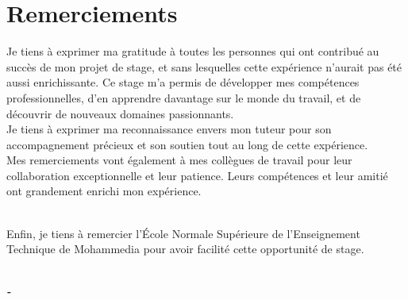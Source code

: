 \newpage
\thispagestyle{empty}
\mbox{} %
\chapter*{\Huge Remerciements }
\begin{quoting}
	\begin{center}
		\large{
			Je tiens à exprimer ma gratitude à toutes les personnes qui ont
contribué au succès de mon projet de stage, et sans lesquelles cette
expérience n’aurait pas été aussi enrichissante. Ce stage m’a permis de
développer mes compétences professionnelles, d’en apprendre davantage
sur le monde du travail, et de découvrir de nouveaux domaines
passionnants.\\

            Je tiens à exprimer ma reconnaissance envers mon tuteur pour son accompagnement précieux et son soutien tout au long de cette expérience.\\

            Mes remerciements vont également à mes collègues de travail pour leur collaboration exceptionnelle et leur patience. Leurs compétences et leur amitié ont grandement enrichi mon expérience.\\\

            Enfin, je tiens à remercier l’École Normale Supérieure de l’Enseignement Technique de Mohammedia pour avoir facilité cette opportunité de stage.\\\
}
	\end{center}
	\bigskip
	\medskip
\end{quoting}

\begin{adjustwidth}{2cm}{1cm}
	\hspace*{\fill} \textbf{\textit{\large{- }}}
\end{adjustwidth}

\clearpage
